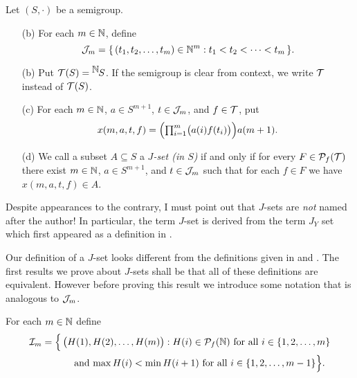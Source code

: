 \begin{defn}
  Let $(S, \cdot)$ be a semigroup.
  \begin{itemize}
    \item[(b)] 
      For each $m \in \mathbb{N}$, define
      \[
        \mathcal{J}_m = \{\, (t_1, t_2, \ldots, t_m) \in \mathbb{N}^m : t_1 < t_2 < \cdots < t_m \,\}.
      \]

    \item[(b)] 
      Put $\mathcal{T}(S) = \hbox{${}^{\hbox{$\mathbb{N}$}}\hskip -1 pt S$}$.
      If the semigroup is clear from context, we write $\mathcal{T}$ instead of $\mathcal{T}(S)$.

    \item[(c)] 
      For each $m \in \mathbb{N}$, $a \in S^{m+1}$, $t \in \mathcal{J}_m$, and $f \in \mathcal{T}$, put
      \[
        \textstyle
        x(m, a, t, f) = \Bigl( \prod_{i=1}^m \bigl( a(i)f(t_i) \bigr) \Bigr)a(m+1).
      \]

    \item[(d)] 
      We call a subset $A \subseteq S$ a \emph{$J$-set (in $S$)} if and only if for every $F \in \mathcal{P}_f(\mathcal{T})$ there exist $m \in \mathbb{N}$, $a \in S^{m+1}$, and $t \in \mathcal{J}_m$ such that for each $f \in F$ we have $x(m, a, t, f) \in A$.
  \end{itemize}
\end{defn}
\begin{rmk}
  Despite appearances to the contrary, I must point out that $J$-sets are \textsl{not} named after the author!
  In particular, the term $J$-set is derived from the term $J_Y$ set which first appeared as a definition in \cite[Definition 2.4(b)]{Hindman:1996fk}.
\end{rmk}

Our definition of a $J$-set looks different from the definitions given in \cite[Definition 2.2(a)]{Hindman:2009vn} and \cite[Definition 3.3(d)]{De:2008uq}.
The first results we prove about $J$-sets shall be that all of these definitions are equivalent.
However before proving this result we introduce some notation that is analogous to $\mathcal{J}_m$.

\begin{defn}
  For each $m \in \mathbb{N}$ define
  \begin{align*}
    \mathcal{I}_m &= \Bigl\{\, \bigl( H(1), H(2), \ldots, H(m) \bigr) : \hbox{$H(i) \in \mathcal{P}_f(\mathbb{N})$ for all $i \in \{1, 2, \ldots, m\}$} \\
        &\hspace{3em} \hbox{ and $\max H(i) < \min H(i+1)$ for all $i \in \{1, 2, \ldots, m-1\}$} \Bigr\}.
  \end{align*}
\end{defn}

